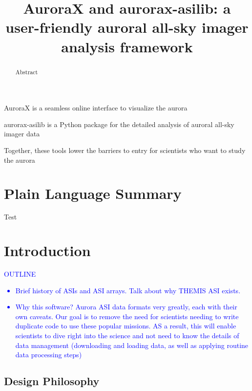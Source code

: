 \documentclass[draft]{agujournal2019}
\begin{document}
\title{AuroraX and aurorax-asilib: a user-friendly auroral all-sky imager analysis framework}





\begin{keypoints}
\item AuroraX is a seamless online interface to visualize the aurora
\item aurorax-asilib is a Python package for the detailed analysis of auroral all-sky imager data 
\item Together, these tools lower the barriers to entry for scientists who want to study the aurora 
\end{keypoints}


\begin{abstract}
Abstract
\end{abstract}


\section*{Plain Language Summary}
Test


\section{Introduction}\label{intro}
\textcolor{blue}{
      OUTLINE
      \begin{itemize}
            \item Brief history of ASIs and ASI arrays. Talk about why THEMIS ASI exists.
            \item Why this software? Aurora ASI data formats very greatly, each with their own caveats. Our goal is to remove the need for scientists needing to write duplicate code to use these popular missions. AS a result, this will enable scientists to dive right into the science and not need to know the details of data management (downloading and loading data, as well as applying routine data processing steps)   
      \end{itemize}
}
\subsection{Design Philosophy}
\end{document}
